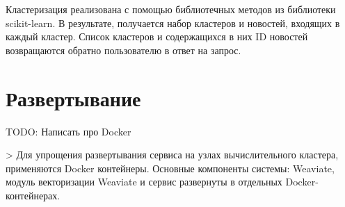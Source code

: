 Кластеризация реализована с помощью библиотечных методов из библиотеки scikit-learn. В результате, получается набор кластеров и новостей, входящих в каждый кластер. Список кластеров и содержащихся в них ID новостей возвращаются обратно пользователю в ответ на запрос.

\section{Развертывание}

TODO: Написать про Docker


> Для упрощения развертывания сервиса на узлах вычислительного кластера, применяются Docker контейнеры. Основные компоненты системы: Weaviate, модуль векторизации Weaviate и сервис развернуты в отдельных Docker-контейнерах.
